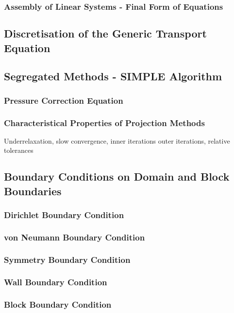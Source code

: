 \documentclass[article,type=msc,colorback,accentcolor=tud2a]{tudthesis}
\begin{document}
      \subsubsection{Assembly of Linear Systems - Final Form of Equations}

    \subsection{Discretisation of the Generic Transport Equation}

    \subsection{Segregated Methods - SIMPLE Algorithm}
      
      \subsubsection{Pressure Correction Equation}
      \subsubsection{Characteristical Properties of Projection Methods}

        Underrelaxation, slow convergence, inner iterations outer iterations, relative tolerances

    \subsection{Boundary Conditions on Domain and Block Boundaries}
      
      \subsubsection{Dirichlet Boundary Condition}
      \subsubsection{von Neumann Boundary Condition}
      \subsubsection{Symmetry Boundary Condition}
      \subsubsection{Wall Boundary Condition}
      \subsubsection{Block Boundary Condition}
      
\end{document}
